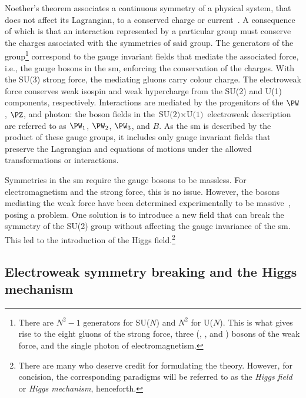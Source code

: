 Noether's theorem associates a continuous symmetry of a physical system, that does not affect its Lagrangian, to a conserved charge or current~\cite{Noether_1971}. A consequence of which is that an interaction represented by a particular group must conserve the charges associated with the symmetries of said group. The generators of the group\footnote{There are $N^2 - \text{1}$ generators for SU($N$) and $N^2$ for U($N$). This is what gives rise to the eight gluons of the strong force, three (\PWplus, \PWminus, and \PZ) bosons of the weak force, and the single photon of electromagnetism.} correspond to the gauge invariant fields that mediate the associated force, i.e., the gauge bosons in the \acrshort{sm}, enforcing the conservation of the charges. With the SU(3) strong force, the mediating gluons carry colour charge. The electroweak force conserves weak isospin and weak hypercharge from the SU(2) and U(1) components, respectively. Interactions are mediated by the progenitors of the $\PW$, $\PZ$, and photon: the boson fields in the $\text{SU(2)} \times \text{U(1)}$ electroweak description are referred to as $\PW_1$, $\PW_2$, $\PW_3$, and $B$. As the \acrshort{sm} is described by the product of these gauge groups, it includes only gauge invariant fields that preserve the Lagrangian and equations of motions under the allowed transformations or interactions.

Symmetries in the \acrlong{sm} require the gauge bosons to be massless. For electromagnetism and the strong force, this is no issue. However, the bosons mediating the weak force have been determined experimentally to be massive~\cite{Arnison:1983mk,Bagnaia:1983zx}, posing a problem. One solution is to introduce a new field that can break the symmetry of the SU(2) group without affecting the gauge invariance of the \acrshort{sm}. This led to the introduction of the Higgs field.\footnote{There are many who deserve credit for formulating the theory. However, for concision, the corresponding paradigms will be referred to as the \emph{Higgs field} or \emph{Higgs mechanism}, henceforth.}





\subsection{Electroweak symmetry breaking and the Higgs mechanism}
\label{subsec:theory_higgs_mechanism}

